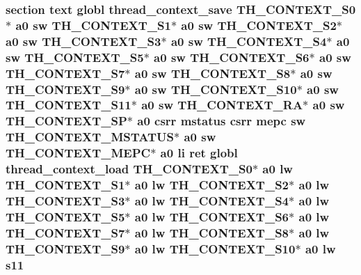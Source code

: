 \hypertarget{riscv_2threada_8S_a0439ffbe4bd7a25aea600cd0079e5a2d}{
\subsubsection[{s11}]{\setlength{\rightskip}{0pt plus 5cm}section text globl {\bf thread\-\_\-context\-\_\-save} {\bf T\-H\-\_\-\-C\-O\-N\-T\-E\-X\-T\-\_\-\-S0}$\ast$ {\bf a0} {\bf sw} {\bf T\-H\-\_\-\-C\-O\-N\-T\-E\-X\-T\-\_\-\-S1}$\ast$ {\bf a0} {\bf sw} {\bf T\-H\-\_\-\-C\-O\-N\-T\-E\-X\-T\-\_\-\-S2}$\ast$ {\bf a0} {\bf sw} {\bf T\-H\-\_\-\-C\-O\-N\-T\-E\-X\-T\-\_\-\-S3}$\ast$ {\bf a0} {\bf sw} {\bf T\-H\-\_\-\-C\-O\-N\-T\-E\-X\-T\-\_\-\-S4}$\ast$ {\bf a0} {\bf sw} {\bf T\-H\-\_\-\-C\-O\-N\-T\-E\-X\-T\-\_\-\-S5}$\ast$ {\bf a0} {\bf sw} {\bf T\-H\-\_\-\-C\-O\-N\-T\-E\-X\-T\-\_\-\-S6}$\ast$ {\bf a0} {\bf sw} {\bf T\-H\-\_\-\-C\-O\-N\-T\-E\-X\-T\-\_\-\-S7}$\ast$ {\bf a0} {\bf sw} {\bf T\-H\-\_\-\-C\-O\-N\-T\-E\-X\-T\-\_\-\-S8}$\ast$ {\bf a0} {\bf sw} {\bf T\-H\-\_\-\-C\-O\-N\-T\-E\-X\-T\-\_\-\-S9}$\ast$ {\bf a0} {\bf sw} {\bf T\-H\-\_\-\-C\-O\-N\-T\-E\-X\-T\-\_\-\-S10}$\ast$ {\bf a0} {\bf sw} {\bf T\-H\-\_\-\-C\-O\-N\-T\-E\-X\-T\-\_\-\-S11}$\ast$ {\bf a0} {\bf sw} {\bf T\-H\-\_\-\-C\-O\-N\-T\-E\-X\-T\-\_\-\-R\-A}$\ast$ {\bf a0} {\bf sw} {\bf T\-H\-\_\-\-C\-O\-N\-T\-E\-X\-T\-\_\-\-S\-P}$\ast$ {\bf a0} csrr {\bf mstatus} csrr {\bf mepc} {\bf sw} {\bf T\-H\-\_\-\-C\-O\-N\-T\-E\-X\-T\-\_\-\-M\-S\-T\-A\-T\-U\-S}$\ast$ {\bf a0} {\bf sw} {\bf T\-H\-\_\-\-C\-O\-N\-T\-E\-X\-T\-\_\-\-M\-E\-P\-C}$\ast$ {\bf a0} {\bf li} ret globl {\bf thread\-\_\-context\-\_\-load} {\bf T\-H\-\_\-\-C\-O\-N\-T\-E\-X\-T\-\_\-\-S0}$\ast$ {\bf a0} {\bf lw} {\bf T\-H\-\_\-\-C\-O\-N\-T\-E\-X\-T\-\_\-\-S1}$\ast$ {\bf a0} {\bf lw} {\bf T\-H\-\_\-\-C\-O\-N\-T\-E\-X\-T\-\_\-\-S2}$\ast$ {\bf a0} {\bf lw} {\bf T\-H\-\_\-\-C\-O\-N\-T\-E\-X\-T\-\_\-\-S3}$\ast$ {\bf a0} {\bf lw} {\bf T\-H\-\_\-\-C\-O\-N\-T\-E\-X\-T\-\_\-\-S4}$\ast$ {\bf a0} {\bf lw} {\bf T\-H\-\_\-\-C\-O\-N\-T\-E\-X\-T\-\_\-\-S5}$\ast$ {\bf a0} {\bf lw} {\bf T\-H\-\_\-\-C\-O\-N\-T\-E\-X\-T\-\_\-\-S6}$\ast$ {\bf a0} {\bf lw} {\bf T\-H\-\_\-\-C\-O\-N\-T\-E\-X\-T\-\_\-\-S7}$\ast$ {\bf a0} {\bf lw} {\bf T\-H\-\_\-\-C\-O\-N\-T\-E\-X\-T\-\_\-\-S8}$\ast$ {\bf a0} {\bf lw} {\bf T\-H\-\_\-\-C\-O\-N\-T\-E\-X\-T\-\_\-\-S9}$\ast$ {\bf a0} {\bf lw} {\bf T\-H\-\_\-\-C\-O\-N\-T\-E\-X\-T\-\_\-\-S10}$\ast$ {\bf a0} {\bf lw} s11}}\label{riscv_2threada_8S_a0439ffbe4bd7a25aea600cd0079e5a2d}
